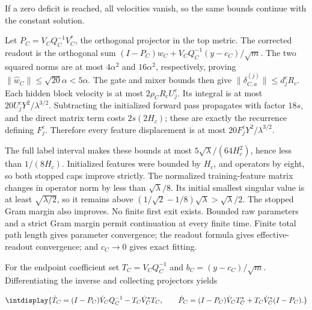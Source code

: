 
If a zero deficit is reached, all velocities vanish, so the same bounds continue with the constant solution.



Let \(P_C=V_CQ_C^{-1}V_C^*\), the orthogonal projector in the top metric. The corrected readout is the orthogonal sum \((I-P_C)w_C+V_CQ_C^{-1}(y-c_C)/\sqrt m\). The two squared norms are at most \(4\alpha^2\) and \(16\alpha^2\), respectively, proving \(\|\widehat w_C\|\le\sqrt{20}\alpha<5\alpha\). The gate and mixer bounds then give \(\|\delta_{C,\allowbreak a}^{(j)}\|\le d_j^cR_c\). Each hidden block velocity is at most \(2\rho_CR_cU_j^c\). Its integral is at most \(20U_j^cY^2/\lambda^{3/2}\). Subtracting the initialized forward pass propagates with factor \(18s\), and the direct matrix term costs \(2s(2H_c)\); these are exactly the recurrence defining \(F_j^c\). Therefore every feature displacement is at most \(20F_j^cY^2/\lambda^{3/2}\).



The full label interval makes these bounds at most \(5\sqrt\lambda/(64H_c^2)\), hence less than \(1/(8H_c)\). Initialized features were bounded by \(H_c\), and operators by eight, so both stopped caps improve strictly. The normalized training-feature matrix changes in operator norm by less than \(\sqrt\lambda/8\). Its initial smallest singular value is at least \(\sqrt{\lambda/2}\), so it remains above \((1/\sqrt2-1/8)\sqrt\lambda>\sqrt\lambda/2\). The stopped Gram margin also improves. No finite first exit exists. Bounded raw parameters and a strict Gram margin permit continuation at every finite time. Finite total path length gives parameter convergence; the readout formula gives effective-readout convergence; and \(c_C\to0\) gives exact fitting.



For the endpoint coefficient set \(T_C=V_CQ_C^{-1}\) and \(b_C=(y-c_C)/\sqrt m\). Differentiating the inverse and collecting projectors yields


\begingroup\renewcommand{\theHequation}{intdisplay.575}
\begin{equation}
\intdisplay{
\dot T_C=(I-P_C)\dot V_CQ_C^{-1}-T_C\dot V_C^*T_C,
\qquad
\dot P_C=(I-P_C)\dot V_CT_C^*+T_C\dot V_C^*(I-P_C).
}
\label{int:eq-0239-harmonic-right-inverse-derivatives}
\end{equation}
\endgroup

